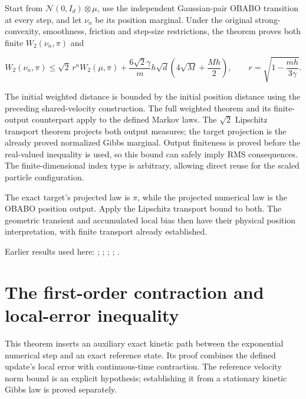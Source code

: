 \documentclass[11pt,a4paper]{report}
\begin{document}
Start from \(\mathcal N(0,I_d)\otimes\mu\), use the independent Gaussian-pair OBABO transition at every step, and let \(\nu_n\) be its position marginal. Under the original strong-convexity, smoothness, friction and step-size restrictions, the theorem proves both finite \(W_2(\nu_n,\pi)\) and

\[W_2(\nu_n,\pi)\le\sqrt2\,r^nW_2(\mu,\pi)+\frac{6\sqrt2\gamma}{m}h\sqrt d\left(4\sqrt M+\frac{Mh}{2}\right),\qquad r=\sqrt{1-\frac{mh}{3\gamma}}.\]

The initial weighted distance is bounded by the initial position distance using the preceding shared-velocity construction. The full weighted theorem and its finite-output counterpart apply to the defined Markov laws. The \(\sqrt 2\) Lipschitz transport theorem projects both output measures; the target projection is the already proved normalized Gibbs marginal. Output finiteness is proved before the real-valued inequality is used, so this bound can safely imply RMS consequences. The finite-dimensional index type is arbitrary, allowing direct reuse for the scaled particle configuration.



The exact target’s projected law is \(\pi\), while the projected numerical law is the OBABO position output. Apply the Lipschitz transport bound to both. The geometric transient and accumulated local bias then have their physical position interpretation, with finite transport already established.



Earlier results used here: \cite[Section~3.17.3]{LangevinLean2026ULASC}; \cite[Section~3.17.4]{LangevinLean2026ULASC}; \cite[Section~3.26.13]{LangevinLean2026ULASC}; \cite[Section~3.26.3]{LangevinLean2026ULASC}; \cite[Section~3.33.11]{LangevinLean2026ULASC}.
\section{\texorpdfstring{The first-order contraction and local-error inequality}{The first-order contraction and local-error inequality}}
\label{proof-module-KineticLangevin-OneStep-lean}


This theorem inserts an auxiliary exact kinetic path between the exponential numerical step and an exact reference state. Its proof combines the defined update's local error with continuous-time contraction. The reference velocity norm bound is an explicit hypothesis; establishing it from a stationary kinetic Gibbs law is proved separately.
\end{document}
